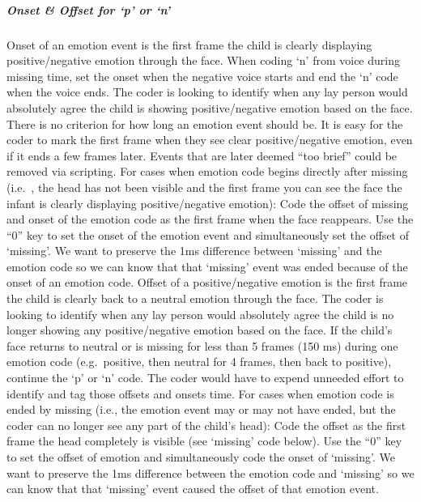 \documentclass[
]{book}
\begin{document}
\hypertarget{onset-offset-for-p-or-n}{%
\subparagraph*{Onset \& Offset for `p' or `n'}\label{onset-offset-for-p-or-n}}

Onset of an emotion event is the first frame the child is clearly displaying positive/negative emotion through the face. When coding `n' from voice during missing time, set the onset when the negative voice starts and end the `n' code when the voice ends. The coder is looking to identify when any lay person would absolutely agree the child is showing positive/negative emotion based on the face.
There is no criterion for how long an emotion event should be. It is easy for the coder to mark the first frame when they see clear positive/negative emotion, even if it ends a few frames later. Events that are later deemed ``too brief'' could be removed via scripting.
For cases when emotion code begins directly after missing (i.e.~, the head has not been visible and the first frame you can see the face the infant is clearly displaying positive/negative emotion): Code the offset of missing and onset of the emotion code as the first frame when the face reappears. Use the ``0'' key to set the onset of the emotion event and simultaneously set the offset of `missing'. We want to preserve the 1ms difference between `missing' and the emotion code so we can know that that `missing' event was ended because of the onset of an emotion code.
Offset of a positive/negative emotion is the first frame the child is clearly back to a neutral emotion through the face. The coder is looking to identify when any lay person would absolutely agree the child is no longer showing any positive/negative emotion based on the face.
If the child's face returns to neutral or is missing for less than 5 frames (150 ms) during one emotion code (e.g.~positive, then neutral for 4 frames, then back to positive), continue the `p' or `n' code. The coder would have to expend unneeded effort to identify and tag those offsets and onsets time.
For cases when emotion code is ended by missing (i.e., the emotion event may or may not have ended, but the coder can no longer see any part of the child's head): Code the offset as the first frame the head completely is visible (see `missing' code below). Use the ``0'' key to set the offset of emotion and simultaneously code the onset of `missing'. We want to preserve the 1ms difference between the emotion code and `missing' so we can know that that `missing' event caused the offset of that emotion event.
\end{document}

